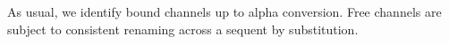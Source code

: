 As usual, we identify bound channels up to alpha conversion. Free channels are subject to consistent renaming across a sequent by substitution.




